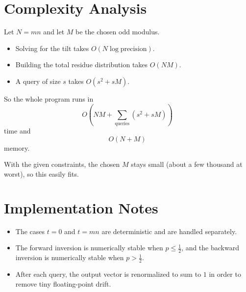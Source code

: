 \documentclass[11pt]{article}
\begin{document}
\section*{Complexity Analysis}

Let $N=mn$ and let $M$ be the chosen odd modulus.

\begin{itemize}[leftmargin=*]
    \item Solving for the tilt takes $O(N \log \text{precision})$.
    \item Building the total residue distribution takes $O(NM)$.
    \item A query of size $s$ takes $O(s^2+sM)$.
\end{itemize}

So the whole program runs in
\[
    O\!\left(NM + \sum_{\text{queries}} (s^2+sM)\right)
\]
time and
\[
    O(N+M)
\]
memory.

With the given constraints, the chosen $M$ stays small (about a few thousand at worst), so this easily fits.

\section*{Implementation Notes}

\begin{itemize}[leftmargin=*]
    \item The cases $t=0$ and $t=mn$ are deterministic and are handled separately.
    \item The forward inversion is numerically stable when $p\le \tfrac12$, and the backward inversion is numerically
    stable when $p>\tfrac12$.
    \item After each query, the output vector is renormalized to sum to $1$ in order to remove tiny floating-point
    drift.
\end{itemize}
\end{document}
